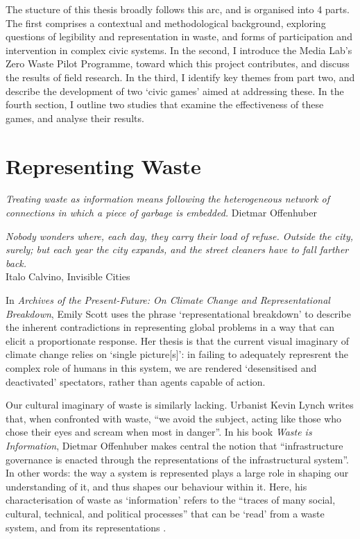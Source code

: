 \documentclass[nofonts,nols,justified,nobib]{tufte-book}
\begin{document}
The stucture of this thesis broadly follows this arc, and is organised into 4 parts. The first comprises a contextual and methodological background, exploring questions of legibility and representation in waste, and forms of participation and intervention in complex civic systems. In the second, I introduce the Media Lab's Zero Waste Pilot Programme, toward which this project contributes, and discuss the results of field research. In the third, I identify key themes from part two, and describe the development of two `civic games' aimed at addressing these. In the fourth section, I outline two studies that examine the effectiveness of these games, and analyse their results.

\chapter{Representing Waste}

\begin{flushright}
\emph{Treating waste as information means following the heterogeneous network of connections in which a piece of garbage is embedded.} \cite{offenhuber_waste_2017}
Dietmar Offenhuber
\end{flushright}

\begin{flushright}
\emph{Nobody wonders where, each day, they carry their load of refuse. Outside the city, surely; but each year the city expands, and the street cleaners have to fall farther back.}\cite{calvino_invisible_1974}\\
Italo Calvino, Invisible Cities
\end{flushright}


In \emph{Archives of the Present-Future: On Climate Change and Representational Breakdown}, Emily Scott uses the phrase `representational breakdown' to describe the inherent contradictions in representing global problems in a way that can elicit a proportionate response. Her thesis is that the current visual imaginary of climate change relies on `single picture[s]': in failing to adequately represrent the complex role of humans in this system, we are rendered `desensitised and deactivated' spectators, rather than agents capable of action.

Our cultural imaginary of waste is similarly lacking. Urbanist Kevin Lynch writes that, when confronted with waste, ``we avoid the subject, acting like those who chose their eyes and scream when most in danger''. In his book \emph{Waste is Information}, Dietmar Offenhuber makes central the notion that ``infrastructure governance is enacted through the representations of the infrastructural system''. In other words: the way a system is represented plays a large role in shaping our understanding of it, and thus shapes our behaviour within it. Here, his characterisation of waste as `information' refers to the ``traces of many social, cultural, technical, and political processes'' that can be `read' from a waste system, and from its representations \cite{offenhuber_waste_2017}. 
\end{document}

